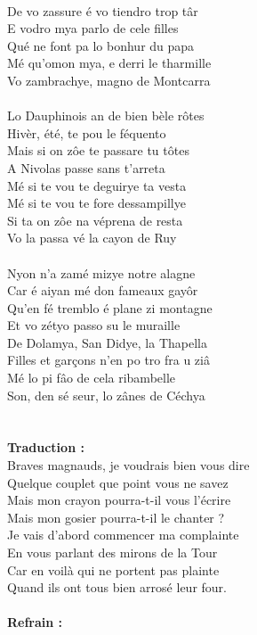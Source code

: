 \\De vo zassure é vo tiendro trop târ
\\E vodro mya parlo de cele filles
\\Qué ne font pa lo bonhur du papa
\\Mé qu'omon mya, e derri le tharmille
\\Vo zambrachye, magno de Montcarra
\breakpage
\\\\Lo Dauphinois an de bien bèle rôtes
\\Hivèr, été, te pou le féquento
\\Mais si on zôe te passare tu tôtes
\\A Nivolas passe sans t'arreta
\\Mé si te vou te deguirye ta vesta
\\Mé si te vou te fore dessampillye
\\Si ta on zôe na véprena de resta
\\Vo la passa vé la cayon de Ruy
\\\\Nyon n'a zamé mizye notre alagne
\\Car é aiyan mé don fameaux gayôr
\\Qu'en fé tremblo é plane zi montagne
\\Et vo zétyo passo su le muraille
\\De Dolamya, San Didye, la Thapella
\\Filles et garçons n'en po tro fra u ziâ
\\Mé lo pi fâo de cela ribambelle
\\Son, den sé seur, lo zânes de Céchya
\\\\\\\textbf{Traduction :}
\\Braves magnauds, je voudrais bien vous dire
\\Quelque couplet que point vous ne savez
\\Mais mon crayon pourra-t-il vous l'écrire
\\Mais mon gosier pourra-t-il le chanter ?
\\Je vais d'abord commencer ma complainte
\\En vous parlant des mirons de la Tour
\\Car en voilà qui ne portent pas plainte
\\Quand ils ont tous bien arrosé leur four.
\\\\\textbf{Refrain :}
